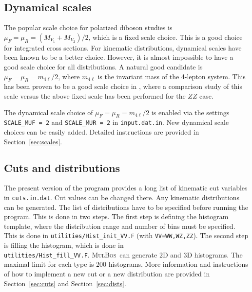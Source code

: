 \documentclass[english,12pt]{article}
\newcommand{\mulbos}{\textsc{MulBos}}
\newcommand{\sect}[1]{Section~\ref{#1}}
\begin{document}
\subsection{Dynamical scales}
\label{sec:dyn_scales}
The popular scale choice for polarized diboson studies is $\mu_F = \mu_R = (M_{V_1} + M_{V_2})/2$, which is a fixed scale choice. 
This is a good choice for integrated cross sections. 
For kinematic distributions, dynamical scales have been known to be a better choice. However, it is almost impossible to have a good scale 
choice for all distributions. A natural good candidate is $\mu_F = \mu_R = m_{4\ell}/2$, where $m_{4\ell}$ is the invariant mass of the 4-lepton 
system. This has been proven to be a good scale choice in \cite{Le:2026vnn}, where a comparison study of this scale versus the above fixed scale has been 
performed for the $ZZ$ case. 

The dynamical scale choice of $\mu_F = \mu_R = m_{4\ell}/2$ is enabled via the settings {\tt SCALE\_MUF = 2} and {\tt SCALE\_MUR = 2} 
in {\tt input.dat.in}. New dynamical scale choices can be easily added. Detailed instructions are provided in \sect{sec:scales}.   
\subsection{Cuts and distributions}
\label{sec:cut_dist}
The present version of the program provides a long list of kinematic cut variables in {\tt cuts.in.dat}. Cut values can be changed there. 
Any kinematic distributions can be generated. The list of distributions have to be specified before running the program. 
This is done in two steps. The first step is defining the histogram template, where the distribution range and number of bins must be specified. 
This is done in {\tt utilities/Hist\_init\_VV.F} (with {\tt VV=WW,WZ,ZZ}). 
The second step is filling the histogram, which is done in \\
{\tt utilities/Hist\_fill\_VV.F}. 
\mulbos\ can generate 2D and 3D histograms. The maximal limit for each type is 200 histograms. 
More information and instructions of how to implement a new cut or a new distribution are provided in \sect{sec:cuts} and \sect{sec:dists}.
\end{document}
